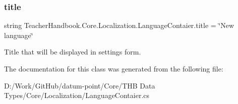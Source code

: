 \subsubsection{\texorpdfstring{title}{title}}
{\footnotesize\ttfamily string Teacher\+Handbook.\+Core.\+Localization.\+Language\+Contaier.\+title = \char`\"{}New language\char`\"{}}



Title that will be displayed in settings form. 



The documentation for this class was generated from the following file\+:\begin{DoxyCompactItemize}
\item 
D\+:/\+Work/\+Git\+Hub/datum-\/point/\+Core/\+T\+H\+B Data Types/\+Core/\+Localization/Language\+Contaier.\+cs\end{DoxyCompactItemize}
